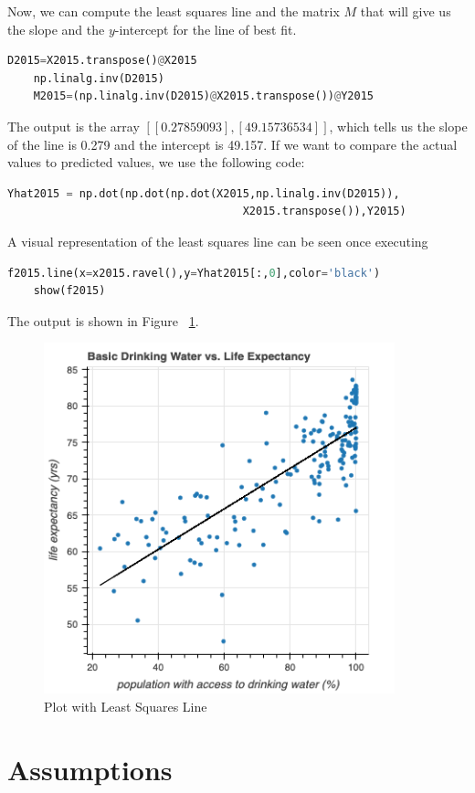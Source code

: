 \documentclass[12pt]{article}
\begin{document}
Now, we can compute the least squares line and the matrix $M$ that will give us the slope and the $y$-intercept for the line of best fit.
\begin{lstlisting}[language=Python]
    D2015=X2015.transpose()@X2015
    np.linalg.inv(D2015)
    M2015=(np.linalg.inv(D2015)@X2015.transpose())@Y2015
\end{lstlisting}

The output is the array $[[0.27859093],[49.15736534]]$, which tells us the slope of the line is 0.279 and the intercept is 49.157. If we want to compare the actual values to predicted values, we use the following code:
\begin{lstlisting}[language=Python]
    Yhat2015 = np.dot(np.dot(np.dot(X2015,np.linalg.inv(D2015)),
                                    X2015.transpose()),Y2015)
\end{lstlisting}

A visual representation of the least squares line can be seen once executing
\begin{lstlisting}[language=Python]
    f2015.line(x=x2015.ravel(),y=Yhat2015[:,0],color='black')
    show(f2015)
\end{lstlisting}
The output is shown in Figure ~\ref{fig4}.
\begin{figure}
    \centering
    \includegraphics[width=4in]{Figures/figure2.png}
    \caption{Plot with Least Squares Line}
    \label{fig4}
\end{figure}

\section*{Assumptions}
\end{document}
